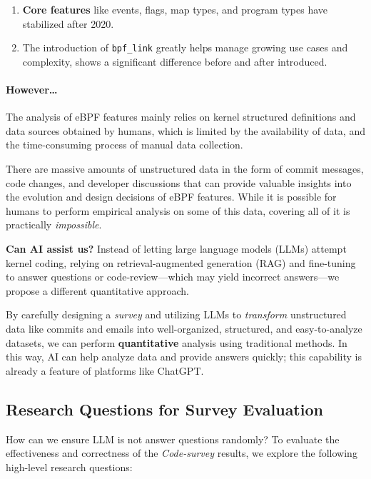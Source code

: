 \begin{enumerate}
    \item \textbf{Core features} like events, flags, map types, and program types have stabilized after 2020.
    \item The introduction of \texttt{bpf\_link} greatly helps manage growing use cases and complexity, shows a significant difference before and after introduced.
\end{enumerate}

\paragraph{However\ldots}

The analysis of eBPF features mainly relies on kernel structured definitions and data sources obtained by humans, which is limited by the availability of data, and the time-consuming process of manual data collection.

There are massive amounts of unstructured data in the form of commit messages, code changes, and developer discussions that can provide valuable insights into the evolution and design decisions of eBPF features. While it is possible for humans to perform empirical analysis on some of this data, covering all of it is practically \emph{impossible}.

\textbf{Can AI assist us?} Instead of letting large language models (LLMs) attempt kernel coding, relying on retrieval-augmented generation (RAG) and fine-tuning to answer questions or code-review—which may yield incorrect answers—we propose a different quantitative approach.

By carefully designing a \emph{survey} and utilizing LLMs to \emph{transform} unstructured data like commits and emails into well-organized, structured, and easy-to-analyze datasets, we can perform \textbf{quantitative} analysis using traditional methods. In this way, AI can help analyze data and provide answers quickly; this capability is already a feature of platforms like ChatGPT.

\subsection{Research Questions for Survey Evaluation}

How can we ensure LLM is not answer questions randomly? To evaluate the effectiveness and correctness of the \emph{Code-survey} results, we explore the following high-level research questions:

